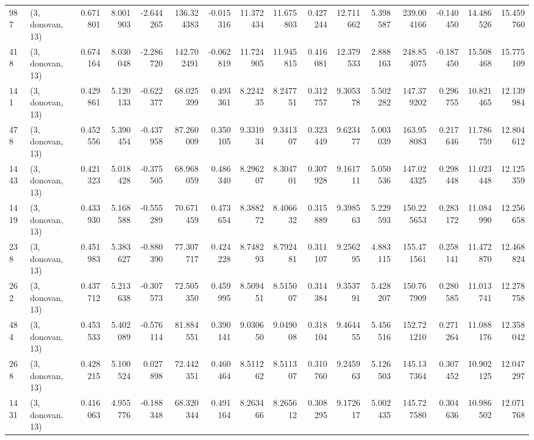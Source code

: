 \begin{tabular}{llrrrrrrrrrrrrrr}
987  &  (3, donovan, 13) &   0.671801 &   8.001903 &  -2.644265 &    136.324383 &   -0.015316 &   11.372434 &   11.675803 &  0.427244 &  12.711662 &   5.398587 &   239.004166 &  -0.140450 &  14.486526 &  15.459760 \\
418  &  (3, donovan, 13) &   0.674164 &   8.030048 &  -2.286720 &    142.702491 &   -0.062819 &   11.724905 &   11.945815 &  0.416081 &  12.379533 &   2.888163 &   248.854075 &  -0.187450 &  15.508468 &  15.775109 \\
141  &  (3, donovan, 13) &   0.429861 &   5.120133 &  -0.622377 &     68.025399 &    0.493361 &    8.224235 &    8.247751 &  0.312757 &   9.305378 &   5.502282 &   147.379202 &   0.296755 &  10.821465 &  12.139984 \\
478  &  (3, donovan, 13) &   0.452556 &   5.390454 &  -0.437958 &     87.260009 &    0.350105 &    9.331034 &    9.341307 &  0.323449 &   9.623477 &   5.003039 &   163.958083 &   0.217646 &  11.786759 &  12.804612 \\
1443 &  (3, donovan, 13) &   0.421323 &   5.018428 &  -0.375505 &     68.968059 &    0.486340 &    8.296207 &    8.304701 &  0.307928 &   9.161711 &   5.050536 &   147.024325 &   0.298448 &  11.023448 &  12.125359 \\
1419 &  (3, donovan, 13) &   0.433930 &   5.168588 &  -0.555289 &     70.671459 &    0.473654 &    8.388272 &    8.406632 &  0.315889 &   9.398563 &   5.229593 &   150.225653 &   0.283172 &  11.084990 &  12.256658 \\
238  &  (3, donovan, 13) &   0.451983 &   5.383627 &  -0.880390 &     77.307717 &    0.424228 &    8.748293 &    8.792481 &  0.311107 &   9.256295 &   4.883115 &   155.471561 &   0.258141 &  11.472870 &  12.468824 \\
262  &  (3, donovan, 13) &   0.437712 &   5.213638 &  -0.307573 &     72.505350 &    0.459995 &    8.509451 &    8.515007 &  0.314384 &   9.353791 &   5.428207 &   150.767909 &   0.280585 &  11.013741 &  12.278758 \\
484  &  (3, donovan, 13) &   0.453533 &   5.402089 &  -0.576114 &     81.884551 &    0.390141 &    9.030650 &    9.049008 &  0.318104 &   9.464455 &   5.456516 &   152.721210 &   0.271264 &  11.088176 &  12.358042 \\
268  &  (3, donovan, 13) &   0.428215 &   5.100524 &   0.027898 &     72.442351 &    0.460464 &    8.511262 &    8.511307 &  0.310760 &   9.245963 &   5.126503 &   145.137364 &   0.307452 &  10.902125 &  12.047297 \\
1431 &  (3, donovan, 13) &   0.416063 &   4.955776 &  -0.188348 &     68.320344 &    0.491164 &    8.263466 &    8.265612 &  0.308295 &   9.172617 &   5.002435 &   145.727580 &   0.304636 &  10.986502 &  12.071768 \\

\end{tabular}
